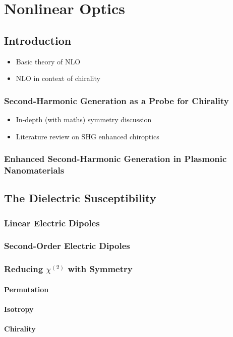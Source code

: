 \chapter{Nonlinear Optics}\label{sec:background:NonlinearOptics}

\section{Introduction}
\begin{itemize}
    \item Basic theory of NLO
    \item NLO in context of chirality
\end{itemize}
\subsection{Second-Harmonic Generation as a Probe for Chirality}\label{sec:background:NonlinearOptics:chirality}
\begin{itemize}
    \item In-depth (with maths) symmetry discussion
    \item Literature review on SHG enhanced chiroptics
\end{itemize}
\subsection{Enhanced Second-Harmonic Generation in Plasmonic Nanomaterials}\label{sec:background:NonlinearOptics:plasmonic}

\section{The Dielectric Susceptibility}\label{sec:background:NonlinearOptics:susceptibility}
\subsection{Linear Electric Dipoles}
\subsection{Second-Order Electric Dipoles}
\subsection{Reducing \texorpdfstring{$\chi^{(2)}$}{Lg} with Symmetry}\label{sec:background:NonlinearOptics:tensorsymmetry}
\subsubsection{Permutation}\label{sec:background:NonlinearOptics:tensorsymmetry:permutation}
\subsubsection{Isotropy}\label{sec:background:NonlinearOptics:tensorsymmetry:isotropy}
\subsubsection{Chirality}\label{sec:background:NonlinearOptics:tensorsymmetry:chirality}